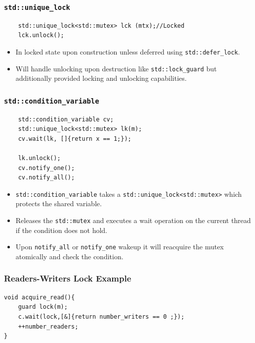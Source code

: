 \documentclass[9pt,landscape,a4paper, table]{extarticle}
\begin{document}
\begin{multicols*}{3}
\subsubsection{\texttt{std::unique\_lock}}

\begin{verbatim}
    std::unique_lock<std::mutex> lck (mtx);//Locked
    lck.unlock();
\end{verbatim}

\begin{itemize}
    \item In locked state upon construction unless deferred using \texttt{std::defer\_lock}.
    \item Will handle unlocking upon destruction like \texttt{std::lock\_guard} but additionally provided locking and unlocking capabilities. 
\end{itemize}

\subsubsection{\texttt{std::condition\_variable}}

\begin{verbatim}
    std::condition_variable cv;
    std::unique_lock<std::mutex> lk(m);
    cv.wait(lk, []{return x == 1;});
    
    lk.unlock();
    cv.notify_one();
    cv.notify_all();
\end{verbatim}


\begin{itemize}
    \item \texttt{std::condition\_variable} takes a \texttt{std::unique\_lock<std::mutex>} which protects the shared variable.
    \item Releases the \texttt{std::mutex} and executes a wait operation on the current thread if the condition does not hold. 
    \item Upon \texttt{notify\_all} or \texttt{notify\_one} wakeup it will reacquire the mutex atomically and check the condition. 
\end{itemize}

\subsubsection{Readers-Writers Lock Example}
\begin{verbatim}
void acquire_read(){
    guard lock(m);
    c.wait(lock,[&]{return number_writers == 0 ;});
    ++number_readers;
}
  

\end{verbatim}
\end{multicols*}
\end{document}
